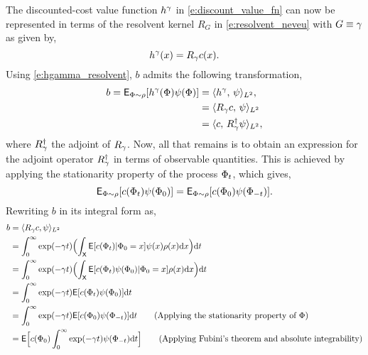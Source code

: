 The discounted-cost value function $h^\gamma$ in \eqref{e:discount_value_fn} can now be represented in terms of the resolvent kernel $R_G$ in \eqref{e:resolvent_neveu} with $G \equiv \gamma$ as given by,
\begin{equation}
h^\discount(x) = R_\discount c(x).
\label{e:hgamma_resolvent}
\end{equation}
Using \eqref{e:hgamma_resolvent}, $b$ admits the following transformation,
\[
\begin{aligned}
b = {\sf E}_{\Phi \sim \rho} [h^\gamma(\Phi) \psi(\Phi) ] &= \langle h^\gamma, \, \psi \rangle_{L^2},\\
& = \langle R_\gamma c, \,\psi \rangle_{L^2} \\
& = \langle c,\, R^\dagger_\gamma \psi \rangle_{L^2},
\end{aligned}
\]
where $R^\dagger_\gamma$ the adjoint of $R_\gamma$. Now, all that remains is to obtain an expression for the adjoint operator $R^\dagger_\gamma$ in terms of observable quantities. This is achieved by applying the stationarity property of the process $\Phi_t$, which gives, 
\[
{\sf E}_{\Phi \sim \rho}[c(\Phi_t) \psi(\Phi_0)] = {\sf E}_{\Phi \sim \rho} [c(\Phi_0) \psi(\Phi_{-t})].
\] 
Rewriting $b$ in its integral form as,
\begin{equation}
\begin{aligned}
b & = \langle R_\discount c, \basis \rangle_{L^2} \\
& = \int_0^\infty \exp(-\discount t)  \Bigl(\int_{\state} \Expect[c(\markovstate_t)| \markovstate_0 = x] \basis(x)  \pr(x) \ud x \Bigr) \ud t \\
& = \int_0^\infty \exp(-\discount t)  \Bigl(\int_{\state} \Expect[c(\markovstate_t) \basis(\markovstate_0)| \markovstate_0 = x]  \pr(x) \ud x \Bigr) \ud t \\
& = \int_0^\infty \exp(-\discount t) \Expect[c(\markovstate_t) \basis(\markovstate_0)]\ud t \\
& = \int_0^\infty \exp(-\discount t) \Expect[c(\markovstate_0) \basis(\markovstate_{-t})] \ud t \qquad \text{(Applying the stationarity property of $\markovstate$)}\\
& = \Expect\Bigl[c(\markovstate_0) \int_0^\infty \exp(-\discount t) \basis(\markovstate_{-t})\ud t\Bigr]  \qquad \text{(Applying Fubini's theorem and absolute integrability)}
\label{e:lstd_resolution}
\end{aligned}
\end{equation}
